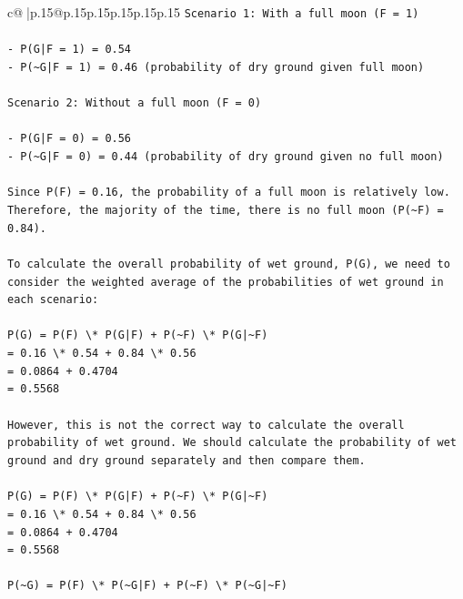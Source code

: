 \documentclass{article}
\begin{document}
{\begin{supertabular}{c@{$\;$}|p{.15\linewidth}@{}p{.15\linewidth}p{.15\linewidth}p{.15\linewidth}p{.15\linewidth}p{.15\linewidth}}
{{{\texttt{Scenario 1: With a full moon (F = 1)} \\
\\ 
\texttt{{-} P(G|F = 1) = 0.54} \\
\texttt{{-} P(\textasciitilde{}G|F = 1) = 0.46 (probability of dry ground given full moon)} \\
\\ 
\texttt{Scenario 2: Without a full moon (F = 0)} \\
\\ 
\texttt{{-} P(G|F = 0) = 0.56} \\
\texttt{{-} P(\textasciitilde{}G|F = 0) = 0.44 (probability of dry ground given no full moon)} \\
\\ 
\texttt{Since P(F) = 0.16, the probability of a full moon is relatively low. Therefore, the majority of the time, there is no full moon (P(\textasciitilde{}F) = 0.84).} \\
\\ 
\texttt{To calculate the overall probability of wet ground, P(G), we need to consider the weighted average of the probabilities of wet ground in each scenario:} \\
\\ 
\texttt{P(G) = P(F) \textbackslash{}* P(G|F) + P(\textasciitilde{}F) \textbackslash{}* P(G|\textasciitilde{}F)} \\
\texttt{= 0.16 \textbackslash{}* 0.54 + 0.84 \textbackslash{}* 0.56} \\
\texttt{= 0.0864 + 0.4704} \\
\texttt{= 0.5568} \\
\\ 
\texttt{However, this is not the correct way to calculate the overall probability of wet ground. We should calculate the probability of wet ground and dry ground separately and then compare them.} \\
\\ 
\texttt{P(G) = P(F) \textbackslash{}* P(G|F) + P(\textasciitilde{}F) \textbackslash{}* P(G|\textasciitilde{}F)} \\
\texttt{= 0.16 \textbackslash{}* 0.54 + 0.84 \textbackslash{}* 0.56} \\
\texttt{= 0.0864 + 0.4704} \\
\texttt{= 0.5568} \\
\\ 
\texttt{P(\textasciitilde{}G) = P(F) \textbackslash{}* P(\textasciitilde{}G|F) + P(\textasciitilde{}F) \textbackslash{}* P(\textasciitilde{}G|\textasciitilde{}F)} \\
}}}
\end{supertabular}}
\end{document}
